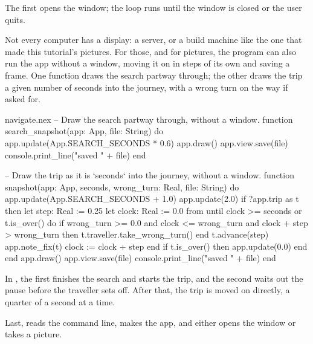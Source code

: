 The first  opens the window; the loop runs until the window is
closed or the user quits.

Not every computer has a display: a server, or a build machine like the
one that made this tutorial's pictures. For those, and for pictures, the
program can also run the app without a window, moving it on in steps of its
own and saving a frame. One function draws the search partway through; the
other draws the trip a given number of seconds into the journey, with a
wrong turn on the way if asked for.

\begin{continued}{navigate.nex}
-- Draw the search partway through, without a window.
function search_snapshot(app: App, file: String) do
  app.update(App.SEARCH_SECONDS * 0.6)
  app.draw()
  app.view.save(file)
  console.print_line("saved " + file)
end

-- Draw the trip as it is `seconds` into the journey, without a window.
function snapshot(app: App, seconds, wrong_turn: Real, file: String) do
  app.update(App.SEARCH_SECONDS + 1.0)
  app.update(2.0)
  if ?app.trip as t then
    let step: Real := 0.25
    let clock: Real := 0.0
    from
    until
      clock >= seconds or t.is_over()
    do
      if wrong_turn >= 0.0 and clock <= wrong_turn and clock + step > wrong_turn then
        t.traveller.take_wrong_turn()
      end
      t.advance(step)
      app.note_fix(t)
      clock := clock + step
    end
    if t.is_over() then
      app.update(0.0)
    end
  end
  app.draw()
  app.view.save(file)
  console.print_line("saved " + file)
end
\end{continued}

In , the first  finishes the search and starts
the trip, and the second waits out the pause before the traveller sets off.
After that, the trip is moved on directly, a quarter of a second at a time.

Last,  reads the command line, makes the app, and either opens
the window or takes a picture.

